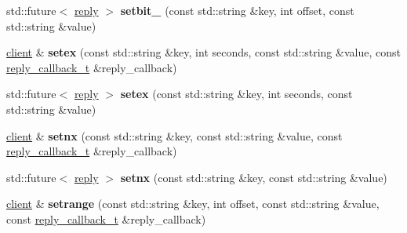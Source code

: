 \begin{DoxyCompactItemize}
\item 
\mbox{\label{classcpp__redis_1_1client_abbf3233f6c395c5d4bdf7810c80e6c05}} 
std\+::future$<$ \hyperlink{classcpp__redis_1_1reply}{reply} $>$ {\bfseries setbit\+\_\+} (const std\+::string \&key, int offset, const std\+::string \&value)
\item 
\mbox{\label{classcpp__redis_1_1client_a9c82e27a54dc86febda83f34142ea402}} 
\hyperlink{classcpp__redis_1_1client}{client} \& {\bfseries setex} (const std\+::string \&key, int seconds, const std\+::string \&value, const \hyperlink{classcpp__redis_1_1client_a061a1140d36d2eaeda82b09a0bb3f9f2}{reply\+\_\+callback\+\_\+t} \&reply\+\_\+callback)
\item 
\mbox{\label{classcpp__redis_1_1client_a14f1f1c9f50437585a8e758d1a004a67}} 
std\+::future$<$ \hyperlink{classcpp__redis_1_1reply}{reply} $>$ {\bfseries setex} (const std\+::string \&key, int seconds, const std\+::string \&value)
\item 
\mbox{\label{classcpp__redis_1_1client_ad701f8b9e3769986b1af97049b52de83}} 
\hyperlink{classcpp__redis_1_1client}{client} \& {\bfseries setnx} (const std\+::string \&key, const std\+::string \&value, const \hyperlink{classcpp__redis_1_1client_a061a1140d36d2eaeda82b09a0bb3f9f2}{reply\+\_\+callback\+\_\+t} \&reply\+\_\+callback)
\item 
\mbox{\label{classcpp__redis_1_1client_a1ab0db92e48716812e4b30b268ce29ea}} 
std\+::future$<$ \hyperlink{classcpp__redis_1_1reply}{reply} $>$ {\bfseries setnx} (const std\+::string \&key, const std\+::string \&value)
\item 
\mbox{\label{classcpp__redis_1_1client_a3c1a2d69d9473de409f9102b61496f47}} 
\hyperlink{classcpp__redis_1_1client}{client} \& {\bfseries setrange} (const std\+::string \&key, int offset, const std\+::string \&value, const \hyperlink{classcpp__redis_1_1client_a061a1140d36d2eaeda82b09a0bb3f9f2}{reply\+\_\+callback\+\_\+t} \&reply\+\_\+callback)
\item 
\mbox{\label{classcpp__redis_1_1client_a628f79b8f8e424cdd4b70c076c21338a}} 

\end{DoxyCompactItemize}
